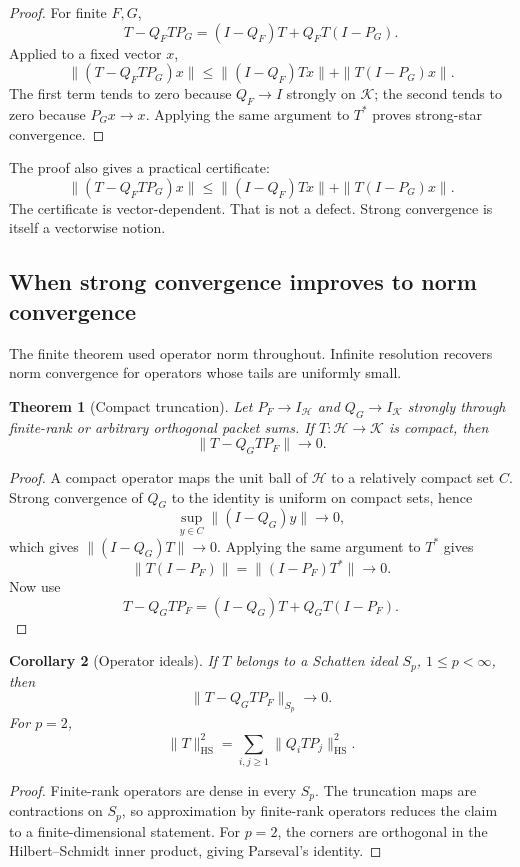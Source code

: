 \documentclass[11pt]{article}
\newtheorem{theorem}{Theorem}[section]
\newtheorem{corollary}[theorem]{Corollary}
\theoremstyle{definition}
\theoremstyle{remark}
\begin{document}
\begin{proof}
For finite $F,G$,
\[
T-Q_FTP_G
=(I-Q_F)T+Q_FT(I-P_G).
\]
Applied to a fixed vector $x$,
\[
\|(T-Q_FTP_G)x\|
\le
\|(I-Q_F)Tx\|+\|T(I-P_G)x\|.
\]
The first term tends to zero because $Q_F\to I$ strongly on $\mathcal K$; the second tends to zero because $P_Gx\to x$.  Applying the same argument to $T^*$ proves strong-star convergence.
\end{proof}

The proof also gives a practical certificate:
\[
\boxed{
\|(T-Q_FTP_G)x\|
\le
\|(I-Q_F)Tx\|+\|T(I-P_G)x\|.
}
\]
The certificate is vector-dependent.  That is not a defect.  Strong convergence is itself a vectorwise notion.

\subsection{When strong convergence improves to norm convergence}

The finite theorem used operator norm throughout.  Infinite resolution recovers norm convergence for operators whose tails are uniformly small.

\begin{theorem}[Compact truncation]
Let $P_F\to I_{\mathcal H}$ and $Q_G\to I_{\mathcal K}$ strongly through finite-rank or arbitrary orthogonal packet sums.  If $T:\mathcal H\to\mathcal K$ is compact, then
\[
\|T-Q_GTP_F\|\longrightarrow0.
\]
\end{theorem}

\begin{proof}
A compact operator maps the unit ball of $\mathcal H$ to a relatively compact set $C$.  Strong convergence of $Q_G$ to the identity is uniform on compact sets, hence
\[
\sup_{y\in C}\|(I-Q_G)y\|\to0,
\]
which gives $\|(I-Q_G)T\|\to0$.  Applying the same argument to $T^*$ gives
\[
\|T(I-P_F)\|=\|(I-P_F)T^*\|\to0.
\]
Now use
\[
T-Q_GTP_F=(I-Q_G)T+Q_GT(I-P_F).
\]
\end{proof}

\begin{corollary}[Operator ideals]
If $T$ belongs to a Schatten ideal $S_p$, $1\le p<\infty$, then
\[
\|T-Q_GTP_F\|_{S_p}\to0.
\]
For $p=2$,
\[
\boxed{
\|T\|_{\mathrm{HS}}^2
=
\sum_{i,j\ge1}\|Q_iTP_j\|_{\mathrm{HS}}^2.
}
\]
\end{corollary}

\begin{proof}
Finite-rank operators are dense in every $S_p$.  The truncation maps are contractions on $S_p$, so approximation by finite-rank operators reduces the claim to a finite-dimensional statement.  For $p=2$, the corners are orthogonal in the Hilbert--Schmidt inner product, giving Parseval's identity.
\end{proof}
\end{document}
